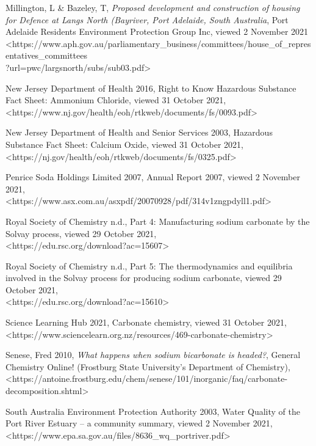 \documentclass[12pt, a4paper]{article}
\begin{document}
Millington, L \& Bazeley, T, \emph{Proposed development and construction of housing for Defence at Langs North (Bayriver, Port Adelaide, South Australia}, Port Adelaide Residents Environment Protection Group Inc, viewed 2 November 2021 \\ \textless{https://www.aph.gov.au/parliamentary\_business/committees/house\_of\_representatives\_committees \\?url=pwc/largsnorth/subs/sub03.pdf}\textgreater

New Jersey Department of Health 2016, Right to Know Hazardous Substance Fact Sheet: Ammonium Chloride, viewed 31 October 2021, \\ \textless{https://www.nj.gov/health/eoh/rtkweb/documents/fs/0093.pdf}\textgreater

New Jersey Department of Health and Senior Services 2003, Hazardous Substance Fact Sheet: Calcium Oxide, viewed 31 October 2021, \\ \textless{https://nj.gov/health/eoh/rtkweb/documents/fs/0325.pdf}\textgreater

Penrice Soda Holdings Limited 2007, Annual Report 2007, viewed 2 November 2021, \\ \textless{https://www.asx.com.au/asxpdf/20070928/pdf/314v1zngpdyll1.pdf}\textgreater

Royal Society of Chemistry n.d., Part 4: Manufacturing sodium carbonate by the Solvay process, viewed 29 October 2021, \\ \textless{https://edu.rsc.org/download?ac=15607}\textgreater

Royal Society of Chemistry n.d., Part 5: The thermodynamics and equilibria involved in the Solvay process for producing sodium carbonate, viewed 29 October 2021, \\ \textless{https://edu.rsc.org/download?ac=15610}\textgreater

Science Learning Hub 2021, Carbonate chemistry, viewed 31 October 2021, \\ \textless{https://www.sciencelearn.org.nz/resources/469-carbonate-chemistry}\textgreater

Senese, Fred 2010, \emph{What happens when sodium bicarbonate is headed?}, General Chemistry Online! (Frostburg State University's Department of Chemistry), \\ \textless{https://antoine.frostburg.edu/chem/senese/101/inorganic/faq/carbonate-decomposition.shtml}\textgreater

South Australia Environment Protection Authority 2003, Water Quality of the Port River Estuary – a community summary, viewed 2 November 2021, \\ \textless{https://www.epa.sa.gov.au/files/8636\_wq\_portriver.pdf}\textgreater
\end{document}

